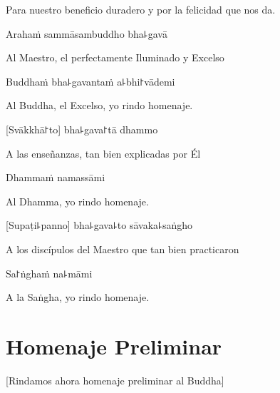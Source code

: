 \begin{english}
Para nuestro beneficio duradero y por la felicidad que nos da.
\end{english}

\clearpage

Arahaṁ sammāsambuddho bha꜕gavā

\begin{english}
Al Maestro, el perfectamente Iluminado y Excelso
\end{english}

Buddhaṁ bha꜕gavantaṁ a꜕bhi꜓vādemi

\begin{english}
  Al Buddha, el Excelso, yo rindo homenaje.
\end{english}

[Svākkhā꜓to] bha꜕gava꜓tā dhammo

\begin{english}
 A las enseñanzas, tan bien explicadas por Él 
\end{english}

Dhammaṁ namassāmi

\begin{english}
  Al Dhamma, yo rindo homenaje.
\end{english}

[Supaṭi꜕panno] bha꜕gava꜕to sāvaka꜕saṅgho

\begin{english}
A los discípulos del Maestro que tan bien practicaron
\end{english}

Sa꜓ṅghaṁ na꜕māmi

\begin{english}
  A la Saṅgha, yo rindo homenaje.
\end{english}

\chapter{Homenaje Preliminar}

\begin{leader}
\end{leader}

\begin{english}
  [Rindamos ahora homenaje preliminar al Buddha]
\end{english}


